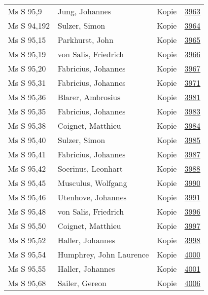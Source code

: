 \documentclass[10pt,a4paper,landscape]{report}
\begin{document}
\begin{longtable}{p{16cm}p{4cm}lr}
Ms S 95,9	&	Jung, Johannes	&	Kopie	&	\href{http://130.60.24.72/assignment/3963}{3963}\\
Ms S 94,192	&	Sulzer, Simon	&	Kopie	&	\href{http://130.60.24.72/assignment/3964}{3964}\\
Ms S 95,15	&	Parkhurst, John	&	Kopie	&	\href{http://130.60.24.72/assignment/3965}{3965}\\
Ms S 95,19	&	von Salis, Friedrich	&	Kopie	&	\href{http://130.60.24.72/assignment/3966}{3966}\\
Ms S 95,20	&	Fabricius, Johannes	&	Kopie	&	\href{http://130.60.24.72/assignment/3967}{3967}\\
Ms S 95,31	&	Fabricius, Johannes	&	Kopie	&	\href{http://130.60.24.72/assignment/3971}{3971}\\
Ms S 95,36	&	Blarer, Ambrosius	&	Kopie	&	\href{http://130.60.24.72/assignment/3981}{3981}\\
Ms S 95,35	&	Fabricius, Johannes	&	Kopie	&	\href{http://130.60.24.72/assignment/3983}{3983}\\
Ms S 95,38	&	Coignet, Matthieu	&	Kopie	&	\href{http://130.60.24.72/assignment/3984}{3984}\\
Ms S 95,40	&	Sulzer, Simon	&	Kopie	&	\href{http://130.60.24.72/assignment/3985}{3985}\\
Ms S 95,41	&	Fabricius, Johannes	&	Kopie	&	\href{http://130.60.24.72/assignment/3987}{3987}\\
Ms S 95,42	&	Soerinus, Leonhart	&	Kopie	&	\href{http://130.60.24.72/assignment/3988}{3988}\\
Ms S 95,45	&	Musculus, Wolfgang	&	Kopie	&	\href{http://130.60.24.72/assignment/3990}{3990}\\
Ms S 95,46	&	Utenhove, Johannes	&	Kopie	&	\href{http://130.60.24.72/assignment/3991}{3991}\\
Ms S 95,48	&	von Salis, Friedrich	&	Kopie	&	\href{http://130.60.24.72/assignment/3996}{3996}\\
Ms S 95,50	&	Coignet, Matthieu	&	Kopie	&	\href{http://130.60.24.72/assignment/3997}{3997}\\
Ms S 95,52	&	Haller, Johannes	&	Kopie	&	\href{http://130.60.24.72/assignment/3998}{3998}\\
Ms S 95,54	&	Humphrey, John Laurence	&	Kopie	&	\href{http://130.60.24.72/assignment/4000}{4000}\\
Ms S 95,55	&	Haller, Johannes	&	Kopie	&	\href{http://130.60.24.72/assignment/4001}{4001}\\
Ms S 95,68	&	Sailer, Gereon	&	Kopie	&	\href{http://130.60.24.72/assignment/4006}{4006}\\

\end{longtable}
\end{document}
